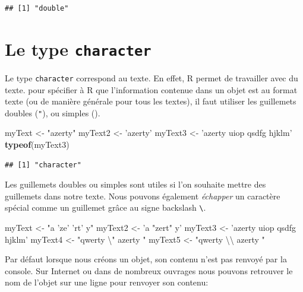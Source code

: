 \documentclass[]{book}
\newenvironment{Shaded}{\begin{snugshade}}{\end{snugshade}}
\newcommand{\CharTok}[1]{\textcolor[rgb]{0.31,0.60,0.02}{#1}}
\newcommand{\KeywordTok}[1]{\textcolor[rgb]{0.13,0.29,0.53}{\textbf{#1}}}
\newcommand{\NormalTok}[1]{#1}
\newcommand{\StringTok}[1]{\textcolor[rgb]{0.31,0.60,0.02}{#1}}
\begin{document}
\begin{verbatim}
## [1] "double"
\end{verbatim}

\hypertarget{le-type-character}{%
\section{\texorpdfstring{Le type \texttt{character}}{Le type character}}\label{le-type-character}}

Le type \texttt{character} correspond au texte. En effet, R permet de travailler avec du texte. pour spécifier à R que l'information contenue dans un objet est au format texte (ou de manière générale pour tous les textes), il faut utiliser les guillemets doubles (\texttt{"}), ou simples (\texttt{\textquotesingle{}}).

\begin{Shaded}
\begin{Highlighting}[]
\NormalTok{myText <-}\StringTok{ "azerty"}
\NormalTok{myText2 <-}\StringTok{ 'azerty'}
\NormalTok{myText3 <-}\StringTok{ 'azerty uiop qsdfg hjklm'}
\KeywordTok{typeof}\NormalTok{(myText3)}
\end{Highlighting}
\end{Shaded}

\begin{verbatim}
## [1] "character"
\end{verbatim}

Les guillemets doubles ou simples sont utiles si l'on souhaite mettre des guillemets dans notre texte. Nous pouvons également \emph{échapper} un caractère spécial comme un guillemet grâce au signe backslash \texttt{\textbackslash{}}.

\begin{Shaded}
\begin{Highlighting}[]
\NormalTok{myText <-}\StringTok{ "a 'ze' 'rt' y"}
\NormalTok{myText2 <-}\StringTok{ 'a "zert" y'}
\NormalTok{myText3 <-}\StringTok{ 'azerty uiop qsdfg hjklm'}
\NormalTok{myText4 <-}\StringTok{ "qwerty }\CharTok{\textbackslash{}"}\StringTok{ azerty "}
\NormalTok{myText5 <-}\StringTok{ "qwerty }\CharTok{\textbackslash{}\textbackslash{}}\StringTok{ azerty "}
\end{Highlighting}
\end{Shaded}

Par défaut lorsque nous créons un objet, son contenu n'est pas renvoyé par la console. Sur Internet ou dans de nombreux ouvrages nous pouvons retrouver le nom de l'objet sur une ligne pour renvoyer son contenu:
\end{document}
